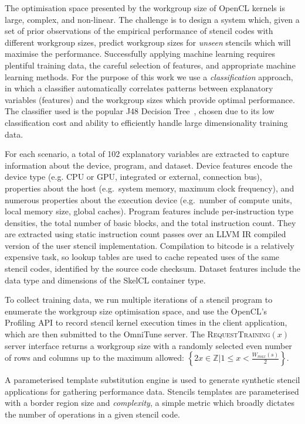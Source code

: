 \documentclass[nonatbib,preprint,9pt]{sigplanconf}
\begin{document}
The optimisation space presented by the workgroup size of OpenCL
kernels is large, complex, and non-linear. The challenge is to design
a system which, given a set of prior observations of the empirical
performance of stencil codes with different workgroup sizes, predict
workgroup sizes for \emph{unseen} stencils which will maximise the
performance. Successfully applying machine learning requires plentiful
training data, the careful selection of features, and appropriate
machine learning methods. For the purpose of this work we use a
\emph{classification} approach, in which a classifier automatically
correlates patterns between explanatory variables (features) and the
workgroup sizes which provide optimal performance. The classifier used
is the popular J48 Decision Tree~\cite{Han2011}, chosen due to its low
classification cost and ability to efficiently handle large
dimensionality training data.

For each scenario, a total of 102 explanatory variables are extracted
to capture information about the device, program, and dataset. Device
features encode the device type (e.g. CPU or GPU, integrated or
external, connection bus), properties about the host (e.g.\ system
memory, maximum clock frequency), and numerous properties about the
execution device (e.g.\ number of compute units, local memory size,
global caches). Program features include per-instruction type
densities, the total number of basic blocks, and the total instruction
count. They are extracted using static instruction count passes over
an LLVM IR compiled version of the user stencil
implementation. Compilation to bitcode is a relatively expensive task,
so lookup tables are used to cache repeated uses of the same stencil
codes, identified by the source code checksum. Dataset features
include the data type and dimensions of the SkelCL container type.

To collect training data, we run multiple iterations of a stencil
program to enumerate the workgroup size optimisation space, and use
the OpenCL's Profiling API to record stencil kernel execution times in
the client application, which are then submitted to the OmniTune
server. The \textsc{RequestTraining}$(x)$ server interface returns a
workgroup size with a randomly selected even number of rows and
columns up to the maximum allowed:
$\left\{ 2x \in \mathbb{Z} | 1 \le x < \frac{W_{max}(s)}{2} \right\}$.

A parameterised template substitution engine is used to generate
synthetic stencil applications for gathering performance
data. Stencils templates are parameterised with a border region size
and \emph{complexity}, a simple metric which broadly dictates the
number of operations in a given stencil code.
\end{document}

